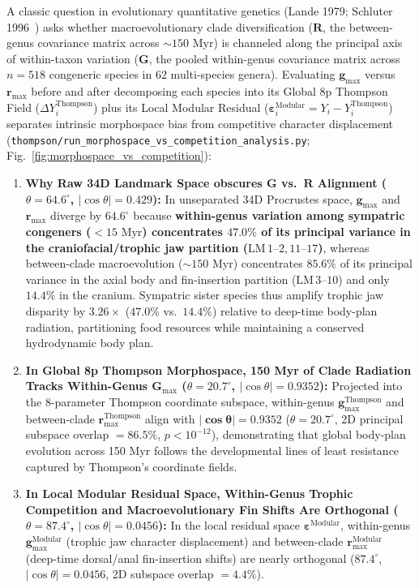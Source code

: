 \documentclass[11pt,a4paper]{article}
\theoremstyle{definition}
\theoremstyle{remark}
\begin{document}
A classic question in evolutionary quantitative genetics (Lande 1979; Schluter 1996~\cite{Schluter1996}) asks whether macroevolutionary clade diversification ($\mathbf{R}$, the between-genus covariance matrix across $\sim 150\text{ Myr}$) is channeled along the principal axis of within-taxon variation ($\mathbf{G}$, the pooled within-genus covariance matrix across $n = 518$ congeneric species in 62 multi-species genera). Evaluating $\mathbf{g}_{\max}$ versus $\mathbf{r}_{\max}$ before and after decomposing each species into its Global 8p Thompson Field ($\Delta Y_i^{\mathrm{Thompson}}$) plus its Local Modular Residual ($\boldsymbol{\varepsilon}_i^{\mathrm{Modular}} = Y_i - Y_i^{\mathrm{Thompson}}$) separates intrinsic morphospace bias from competitive character displacement (\texttt{thompson/run\_morphospace\_vs\_competition\_analysis.py}; Fig.~\ref{fig:morphospace_vs_competition}):
\begin{enumerate}
  \item \textbf{Why Raw 34D Landmark Space obscures $\mathbf{G}$ vs.\ $\mathbf{R}$ Alignment ($\theta = 64.6^\circ$, $|\cos\theta| = 0.429$):}
  In unseparated 34D Procrustes space, $\mathbf{g}_{\max}$ and $\mathbf{r}_{\max}$ diverge by $64.6^\circ$ because \textbf{within-genus variation among sympatric congeners ($<15\text{ Myr}$) concentrates $47.0\%$ of its principal variance in the craniofacial/trophic jaw partition ($\mathrm{LM}\,1\text{--}2, 11\text{--}17$)}, whereas between-clade macroevolution ($\sim 150\text{ Myr}$) concentrates $\mathbf{85.6\%}$ of its principal variance in the axial body and fin-insertion partition ($\mathrm{LM}\,3\text{--}10$) and only $\mathbf{14.4\%}$ in the cranium. Sympatric sister species thus amplify trophic jaw disparity by $\mathbf{3.26\times}$ ($47.0\%$ vs.\ $14.4\%$) relative to deep-time body-plan radiation, partitioning food resources while maintaining a conserved hydrodynamic body plan.
  \item \textbf{In Global 8p Thompson Morphospace, 150 Myr of Clade Radiation Tracks Within-Genus $\mathbf{G}_{\max}$ ($\theta = 20.7^\circ$, $|\cos\theta| = 0.9352$):}
  Projected into the 8-parameter Thompson coordinate subspace, within-genus $\mathbf{g}_{\max}^{\mathrm{Thompson}}$ and between-clade $\mathbf{r}_{\max}^{\mathrm{Thompson}}$ align with $\mathbf{|\cos\theta| = 0.9352}$ ($\theta = \mathbf{20.7^\circ}$, 2D principal subspace overlap $= \mathbf{86.5\%}$, $p < 10^{-12}$), demonstrating that global body-plan evolution across 150 Myr follows the developmental lines of least resistance captured by Thompson's coordinate fields.
  \item \textbf{In Local Modular Residual Space, Within-Genus Trophic Competition and Macroevolutionary Fin Shifts Are Orthogonal ($\theta = 87.4^\circ$, $|\cos\theta| = 0.0456$):}
  In the local residual space $\boldsymbol{\varepsilon}^{\mathrm{Modular}}$, within-genus $\mathbf{g}_{\max}^{\mathrm{Modular}}$ (trophic jaw character displacement) and between-clade $\mathbf{r}_{\max}^{\mathrm{Modular}}$ (deep-time dorsal/anal fin-insertion shifts) are nearly orthogonal ($87.4^\circ$, $|\cos\theta| = 0.0456$, 2D subspace overlap $= 4.4\%$).
\end{enumerate}
\end{document}
